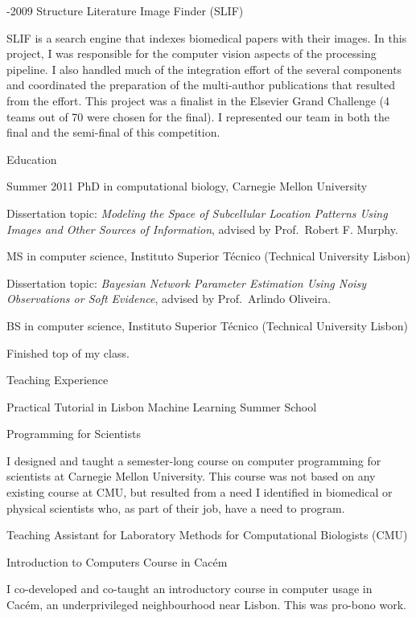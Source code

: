 \documentclass{article}
\renewcommand\section[1]{%
    \par\vspace{2em}%
    {\subhead #1}%
    \par\vspace{1em}%
}
\newcommand\cvitem[2][\relax]{%
    \par\vspace{.8em}
    \if\relax#1\else{\Date \textcolor{medg}{#1}}\hspace{1em}\fi%
    {\CvItem #2}%
    \par\vspace{.4em}
}
\begin{document}
\cvitem[2008-2009]{Structure Literature Image Finder (SLIF)}
SLIF is a search engine that indexes biomedical papers with their images. In
this project, I was responsible for the computer vision aspects of the
processing pipeline. I also handled much of the integration effort of the
several components and coordinated the preparation of the multi-author
publications that resulted from the effort. This project was a finalist in the
Elsevier Grand Challenge (4 teams out of 70 were chosen for the final). I
represented our team in both the final and the semi-final of this competition.

\section{Education}

\cvitem[Summer 2011]{PhD in computational biology, Carnegie Mellon University}
Dissertation topic: \emph{Modeling the Space of Subcellular Location Patterns
Using Images and Other Sources of Information}, advised by Prof.\ Robert F.
Murphy.

\cvitem[2006]{MS in computer science, Instituto Superior T\'ecnico (Technical University Lisbon)}
Dissertation topic: \emph{Bayesian Network Parameter Estimation Using Noisy
Observations or Soft Evidence}, advised by Prof.\ Arlindo Oliveira.

\cvitem[2004]{BS in computer science, Instituto Superior T\'ecnico (Technical University Lisbon)}
Finished top of my class.

\section{Teaching Experience}

\cvitem[2011]{Practical Tutorial in Lisbon Machine Learning Summer School}

\cvitem[2009]{Programming for Scientists}
I designed and taught a semester-long course on computer programming for
scientists at Carnegie Mellon University. This course was not based on any
existing course at CMU, but resulted from a need I identified in biomedical or
physical scientists who, as part of their job, have a need to program.

\cvitem[2008]{Teaching Assistant for Laboratory Methods for Computational Biologists (CMU)}
\cvitem[2005]{Introduction to Computers Course in Cac\'em}
I co-developed and co-taught an introductory course in computer usage in
Cac\'em, an underprivileged neighbourhood near Lisbon. This was pro-bono work.
\end{document}
